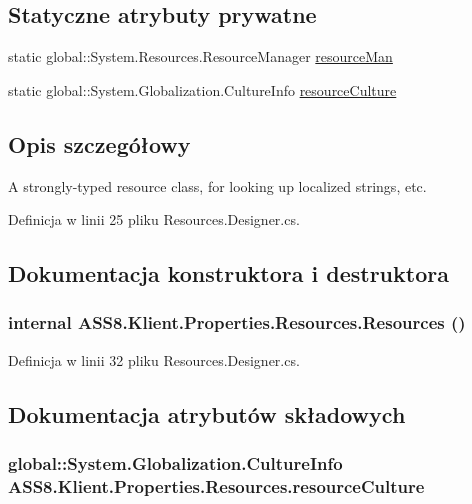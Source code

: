 \subsection*{Statyczne atrybuty prywatne}
\begin{CompactItemize}
\item 
static global::System.Resources.ResourceManager \hyperlink{a00022_3a3cac266a27008b10c3849a4ee74cb9}{resourceMan}
\item 
static global::System.Globalization.CultureInfo \hyperlink{a00022_d7db19add82befdada9db18e1aa68c28}{resourceCulture}
\end{CompactItemize}


\subsection{Opis szczegółowy}
A strongly-typed resource class, for looking up localized strings, etc. 



Definicja w linii 25 pliku Resources.Designer.cs.

\subsection{Dokumentacja konstruktora i destruktora}
\hypertarget{a00022_282497759bf2ecca8387e2523d57c2de}{
\subsubsection[{Resources}]{\setlength{\rightskip}{0pt plus 5cm}internal ASS8.Klient.Properties.Resources.Resources ()}}
\label{d7/de0/a00022_282497759bf2ecca8387e2523d57c2de}




Definicja w linii 32 pliku Resources.Designer.cs.

\subsection{Dokumentacja atrybutów składowych}
\hypertarget{a00022_d7db19add82befdada9db18e1aa68c28}{
\subsubsection[{resourceCulture}]{\setlength{\rightskip}{0pt plus 5cm}global::System.Globalization.CultureInfo {\bf ASS8.Klient.Properties.Resources.resourceCulture}}}
\label{d7/de0/a00022_d7db19add82befdada9db18e1aa68c28}




